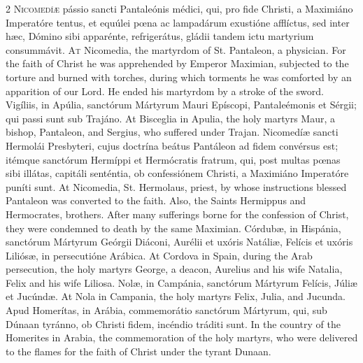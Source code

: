 \begin{paracol}{2}
\lettrine[lines=2]{N}{icomedíæ} pássio sancti 
 Pantaleónis médici, qui, pro fide Christi, a Maximiáno Imperatóre tentus, et 
 equúlei pœna ac lampadárum exustióne afflíctus, sed inter hæc, Dómino sibi 
 apparénte, refrigerátus, gládii tandem ictu martyrium consummávit.
\switchcolumn
{}
\lettrine[lines=2]{A}{t} Nicomedia, the martyrdom of St. 
 Pantaleon, a physician. For the faith of Christ he was apprehended by 
 Emperor Maximian, subjected to the torture and burned with torches, during 
 which torments he was comforted by an apparition of our Lord. He ended 
 his martyrdom by a stroke of the sword.
\switchcolumn*
{}
Vigíliis, in Apúlia, sanctórum Mártyrum Mauri Epíscopi, Pantaleémonis et Sérgii; qui passi sunt 
 sub Trajáno.
\switchcolumn
{}
At Bisceglia in Apulia, the holy 
 martyrs Maur, a bishop, Pantaleon, and Sergius, who suffered under Trajan.
\switchcolumn*
{}
Nicomedíæ sancti 
 Hermolái Presbyteri, cujus doctrína beátus Pantáleon ad fidem convérsus est; 
 itémque sanctórum Hermíppi et Hermócratis fratrum, qui, post multas pœnas 
 sibi illátas, capitáli senténtia, ob confessiónem Christi, a Maximiáno 
 Imperatóre puníti sunt.
\switchcolumn
{}
At Nicomedia, St. Hermolaus, priest, 
 by whose instructions blessed Pantaleon was converted to the faith. 
 Also, the Saints Hermippus and Hermocrates, brothers. After many 
 sufferings borne for the confession of Christ, they were condemned to death 
 by the same Maximian.
\switchcolumn*
{}
Córdubæ, in Hispánia, 
 sanctórum Mártyrum Geórgii Diáconi, Aurélii et uxóris Natáliæ, Felícis et 
 uxóris Liliósæ, in persecutióne Arábica.
\switchcolumn
{}
At Cordova in Spain, during the Arab 
 persecution, the holy martyrs George, a deacon, Aurelius and his wife 
 Natalia, Felix and his wife Liliosa.
\switchcolumn*
{}
Nolæ, in Campánia, sanctórum Mártyrum Felícis, Júliæ et Jucúndæ.
\switchcolumn
{}
At Nola in Campania, the holy 
 martyrs Felix, Julia, and Jucunda.
\switchcolumn*
{}
Apud Homerítas, in 
 Arábia, commemorátio sanctórum Mártyrum, qui, sub Dúnaan tyránno, ob Christi 
 fidem, incéndio tráditi sunt.
\switchcolumn
{}
In the country of the Homerites in 
 Arabia, the commemoration of the holy martyrs, who were delivered to the 
 flames for the faith of Christ under the tyrant Dunaan.
\switchcolumn*

\end{paracol}
